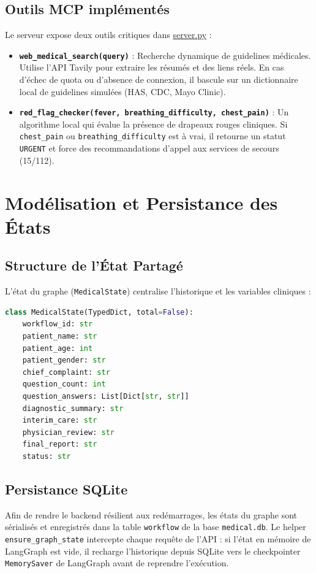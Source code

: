 \documentclass[11pt,a4paper]{report}
\begin{document}
\section{Outils MCP implémentés}
Le serveur expose deux outils critiques dans \href{file:///c:/Users/riyad/OneDrive/Desktop/UNIVERSITE S8/AGENTIC AI/IA_medical_assistant/mcp_server/server.py}{server.py} :
\begin{itemize}
    \item \textbf{\texttt{web\_medical\_search(query)}} : Recherche dynamique de guidelines médicales. Utilise l'API Tavily pour extraire les résumés et des liens réels. En cas d'échec de quota ou d'absence de connexion, il bascule sur un dictionnaire local de guidelines simulées (HAS, CDC, Mayo Clinic).
    \item \textbf{\texttt{red\_flag\_checker(fever, breathing\_difficulty, chest\_pain)}} : Un algorithme local qui évalue la présence de drapeaux rouges cliniques. Si \texttt{chest\_pain} ou \texttt{breathing\_difficulty} est à vrai, il retourne un statut \texttt{URGENT} et force des recommandations d'appel aux services de secours (15/112).
\end{itemize}

\chapter{Modélisation et Persistance des États}
\section{Structure de l'État Partagé}
L'état du graphe (\texttt{MedicalState}) centralise l'historique et les variables cliniques :
\begin{lstlisting}[language=Python, caption=Structure de l'état partagé dans state.py]
class MedicalState(TypedDict, total=False):
    workflow_id: str
    patient_name: str
    patient_age: int
    patient_gender: str
    chief_complaint: str
    question_count: int
    question_answers: List[Dict[str, str]]
    diagnostic_summary: str
    interim_care: str
    physician_review: str
    final_report: str
    status: str
\end{lstlisting}

\section{Persistance SQLite}
Afin de rendre le backend résilient aux redémarrages, les états du graphe sont sérialisés et enregistrés dans la table \texttt{workflow} de la base \texttt{medical.db}. 
Le helper \texttt{ensure\_graph\_state} intercepte chaque requête de l'API : si l'état en mémoire de LangGraph est vide, il recharge l'historique depuis SQLite vers le checkpointer \texttt{MemorySaver} de LangGraph avant de reprendre l'exécution.
\end{document}
